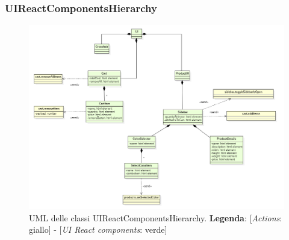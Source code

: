 		
\begin{landscape}
\thispagestyle{empty}
\subsubsection{UIReactComponentsHierarchy}
\begin{figure}[H]
	\centering
	\includegraphics[scale=0.7, keepaspectratio]{./res/images/UIReactComponentsHierarchy.PNG}
	\caption[UML delle classi UIReactComponentsHierarchy]{
	UML delle classi UIReactComponentsHierarchy.
	\textbf{Legenda}: 
	[\textit{Actions}: giallo] -
	[\textit{UI React components}: verde]}
\end{figure}
\end{landscape}
\restoregeometry
